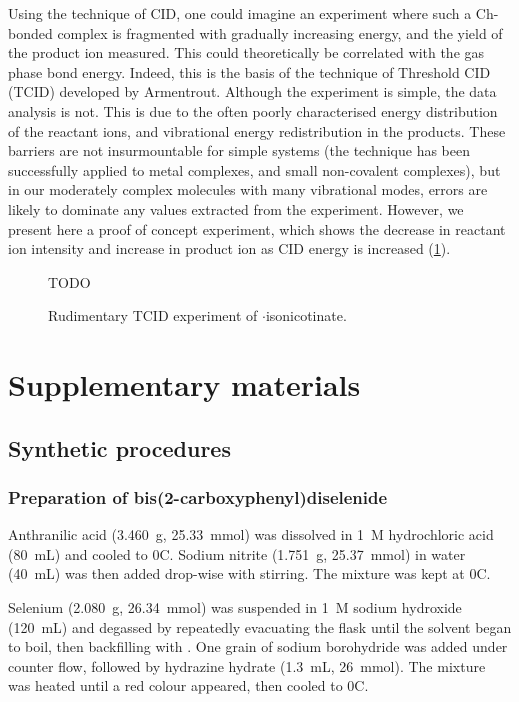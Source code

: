 \begin{refsection}
Using the technique of CID, one could imagine an experiment where such a Ch-bonded complex is fragmented with gradually increasing energy, and the yield of the product ion measured.
This could theoretically be correlated with the gas phase bond energy.
Indeed, this is the basis of the technique of Threshold CID (TCID) developed by Armentrout.\autocite{Armentrout2003,Rodgers2000,Narancic2007}
Although the experiment is simple, the data analysis is not.
This is due to the often poorly characterised energy distribution of the reactant ions, and vibrational energy redistribution in the products.
These barriers are not insurmountable for simple systems (the technique has been successfully applied to metal complexes, and small non-covalent complexes), but in our moderately complex molecules with many vibrational modes, errors are likely to dominate any values extracted from the experiment.
However, we present here a proof of concept experiment, which shows the decrease in reactant ion intensity and increase in product ion as CID energy is increased (\cref{fig:ebs-tcid}).

\begin{figure}
    \centering
    TODO
    \caption[TCID experiment of $\cdot$isonicotinate]{Rudimentary TCID experiment of $\cdot$isonicotinate.}
    \label{fig:ebs-tcid}
\end{figure}

\section{Supplementary materials}

\subsection{Synthetic procedures}

\subsubsection[Preparation of \refcmpd{diselenide}]{Preparation of bis(2-carboxyphenyl)diselenide }
\label{sec:diselenide_prep}
Anthranilic acid (3.460~g, 25.33~mmol) was dissolved in 1~\textsc{M} hydrochloric acid (80~mL) and cooled to 0\degree C.
Sodium nitrite (1.751~g, 25.37~mmol) in water (40~mL) was then added drop-wise with stirring.
The mixture was kept at 0\degree C.

Selenium (2.080~g, 26.34~mmol) was suspended in 1~\textsc{M} sodium hydroxide (120~mL) and degassed by repeatedly evacuating the flask until the solvent began to boil, then backfilling with .
One grain of sodium borohydride was added under  counter flow, followed by hydrazine hydrate (1.3~mL, 26~mmol).
The mixture was heated until a red colour appeared, then cooled to 0\degree C.


\end{refsection}
